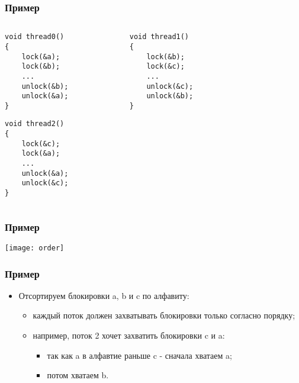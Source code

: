 \begin{frame}[fragile]
\frametitle{Пример}
\begin{columns}
    \begin{column}{.35\linewidth}
        \begin{lstlisting}
void thread0()
{
    lock(&a);
    lock(&b);
    ...
    unlock(&b);
    unlock(&a);
}
        \end{lstlisting}
        \begin{lstlisting}
void thread2()
{
    lock(&c);
    lock(&a);
    ...
    unlock(&a);
    unlock(&c);
}
        \end{lstlisting}
    \end{column}
    \begin{column}{.35\linewidth}
        \begin{lstlisting}
void thread1()
{
    lock(&b);
    lock(&c);
    ...
    unlock(&c);
    unlock(&b);
}
        \end{lstlisting}
    \end{column}
    \begin{column}{.3\linewidth}
    \end{column}
\end{columns}
\end{frame}

\begin{frame}
\frametitle{Пример}
\texttt{[image: order]}
\end{frame}

\begin{frame}
\frametitle{Пример}
\begin{itemize}
    \item<1->Отсортируем блокировки a, b и c по алфавиту:
    \begin{itemize}
        \item<2->каждый поток должен захватывать блокировки только согласно
             порядку;
        \item<3->например, поток 2 хочет захватить блокировки c и a:
        \begin{itemize}
            \item<4->так как a в алфавтие раньше c - сначала хватаем a;
            \item<5->потом хватаем b.
        \end{itemize}
    \end{itemize}
\end{itemize}
\end{frame}

